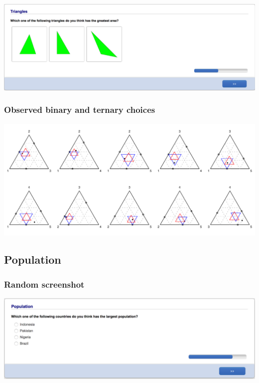 \documentclass[11pt,letter]{article}
\begin{document}
\includegraphics[width=15cm]{Population_study_design/screenshot_Triangles.png}

\subsubsection*{Observed binary and ternary choices}

\includegraphics[width=15cm]{./Population_study_data/Simplexes/Triangles.pdf}

\pagebreak

\subsection*{Population}



\subsubsection*{Random screenshot}

\includegraphics[width=15cm]{Population_study_design/screenshot_Population.png}
\end{document}
